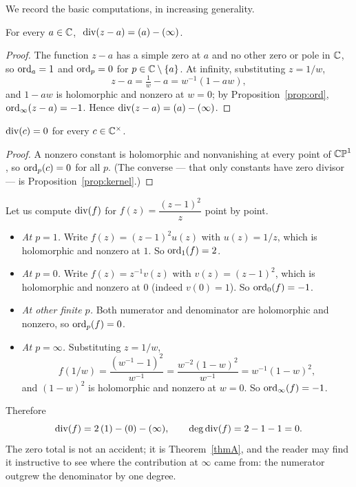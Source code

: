 We record the basic computations, in increasing generality.

\begin{smjproposition}\label{prop:divlinear}
For every $a \in \mathbb{C}$, $\ \operatorname{div}(z-a) = (a) - (\infty)$.
\end{smjproposition}

\begin{proof}
The function $z - a$ has a simple zero at $a$ and no other zero or pole in $\mathbb{C}$,
so $\operatorname{ord}_a = 1$ and $\operatorname{ord}_p = 0$ for $p \in \mathbb{C} \setminus \{a\}$. At infinity,
substituting $z = 1/w$,
\[
z - a = \tfrac{1}{w} - a = w^{-1}(1 - aw),
\]
and $1 - aw$ is holomorphic and nonzero at $w = 0$; by
Proposition~\ref{prop:ord}, $\operatorname{ord}_\infty(z-a) = -1$. Hence
$\operatorname{div}(z-a) = (a) - (\infty)$.
\end{proof}

\begin{smjproposition}\label{prop:divconst}
$\operatorname{div}(c) = 0$ for every $c \in \mathbb{C}^\times$.
\end{smjproposition}

\begin{proof}
A nonzero constant is holomorphic and nonvanishing at every point of $\mathbb{CP}^1$, so
$\operatorname{ord}_p(c) = 0$ for all $p$. (The converse --- that only constants have zero
divisor --- is Proposition~\ref{prop:kernel}.)
\end{proof}

\begin{example}\label{ex:worked}
Let us compute $\operatorname{div}(f)$ for $f(z) = \dfrac{(z-1)^2}{z}$ point by point.
\begin{itemize}[leftmargin=1.5em,itemsep=0.15em]
\item \emph{At $p = 1$.} Write $f(z) = (z-1)^2 u(z)$ with $u(z) = 1/z$, which is
holomorphic and nonzero at $1$. So $\operatorname{ord}_1(f) = 2$.
\item \emph{At $p = 0$.} Write $f(z) = z^{-1} v(z)$ with $v(z) = (z-1)^2$, which
is holomorphic and nonzero at $0$ (indeed $v(0) = 1$). So $\operatorname{ord}_0(f) = -1$.
\item \emph{At other finite $p$.} Both numerator and denominator are holomorphic
and nonzero, so $\operatorname{ord}_p(f) = 0$.
\item \emph{At $p = \infty$.} Substituting $z = 1/w$,
\[
f(1/w) = \frac{(w^{-1}-1)^2}{w^{-1}}
= \frac{w^{-2}(1-w)^2}{w^{-1}} = w^{-1}(1-w)^2 ,
\]
and $(1-w)^2$ is holomorphic and nonzero at $w=0$. So $\operatorname{ord}_\infty(f) = -1$.
\end{itemize}
Therefore
\[
\operatorname{div}(f) = 2\,(1) - (0) - (\infty), \qquad \deg \operatorname{div}(f) = 2 - 1 - 1 = 0 .
\]
The zero total is not an accident; it is Theorem~\ref{thmA}, and the reader may
find it instructive to see where the contribution at $\infty$ came from: the
numerator outgrew the denominator by one degree.
\end{example}

